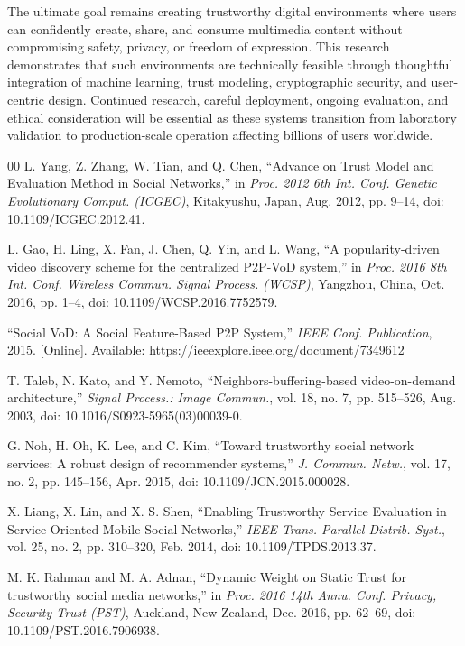 \documentclass[conference]{IEEEtran}
\begin{document}
The ultimate goal remains creating trustworthy digital environments where users can confidently create, share, and consume multimedia content without compromising safety, privacy, or freedom of expression. This research demonstrates that such environments are technically feasible through thoughtful integration of machine learning, trust modeling, cryptographic security, and user-centric design. Continued research, careful deployment, ongoing evaluation, and ethical consideration will be essential as these systems transition from laboratory validation to production-scale operation affecting billions of users worldwide.


\balance
\begin{thebibliography}{00}
 L. Yang, Z. Zhang, W. Tian, and Q. Chen, ``Advance on Trust Model and Evaluation Method in Social Networks,'' in \emph{Proc. 2012 6th Int. Conf. Genetic Evolutionary Comput. (ICGEC)}, Kitakyushu, Japan, Aug. 2012, pp. 9--14, doi: 10.1109/ICGEC.2012.41.

 L. Gao, H. Ling, X. Fan, J. Chen, Q. Yin, and L. Wang, ``A popularity-driven video discovery scheme for the centralized P2P-VoD system,'' in \emph{Proc. 2016 8th Int. Conf. Wireless Commun. Signal Process. (WCSP)}, Yangzhou, China, Oct. 2016, pp. 1--4, doi: 10.1109/WCSP.2016.7752579.

 ``Social VoD: A Social Feature-Based P2P System,'' \emph{IEEE Conf. Publication}, 2015. [Online]. Available: https://ieeexplore.ieee.org/document/7349612

 T. Taleb, N. Kato, and Y. Nemoto, ``Neighbors-buffering-based video-on-demand architecture,'' \emph{Signal Process.: Image Commun.}, vol. 18, no. 7, pp. 515--526, Aug. 2003, doi: 10.1016/S0923-5965(03)00039-0.

 G. Noh, H. Oh, K. Lee, and C. Kim, ``Toward trustworthy social network services: A robust design of recommender systems,'' \emph{J. Commun. Netw.}, vol. 17, no. 2, pp. 145--156, Apr. 2015, doi: 10.1109/JCN.2015.000028.

 X. Liang, X. Lin, and X. S. Shen, ``Enabling Trustworthy Service Evaluation in Service-Oriented Mobile Social Networks,'' \emph{IEEE Trans. Parallel Distrib. Syst.}, vol. 25, no. 2, pp. 310--320, Feb. 2014, doi: 10.1109/TPDS.2013.37.

 M. K. Rahman and M. A. Adnan, ``Dynamic Weight on Static Trust for trustworthy social media networks,'' in \emph{Proc. 2016 14th Annu. Conf. Privacy, Security Trust (PST)}, Auckland, New Zealand, Dec. 2016, pp. 62--69, doi: 10.1109/PST.2016.7906938.


\end{thebibliography}
\end{document}
